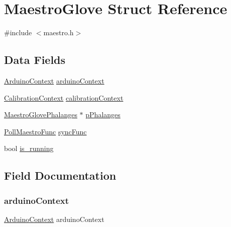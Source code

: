 \hypertarget{struct_maestro_glove}{}\section{Maestro\+Glove Struct Reference}
\label{struct_maestro_glove}


{\ttfamily \#include $<$maestro.\+h$>$}

\subsection*{Data Fields}
\begin{DoxyCompactItemize}
\item 
\hyperlink{struct_arduino_context}{Arduino\+Context} \hyperlink{struct_maestro_glove_a1b23be3f91d761ca3fb50b094c6b7bcb}{arduino\+Context}
\item 
\hyperlink{struct_calibration_context}{Calibration\+Context} \hyperlink{struct_maestro_glove_a58344b4748ecf4e30f6c312652ca7fc5}{calibration\+Context}
\item 
\hyperlink{struct_maestro_glove_phalanges}{Maestro\+Glove\+Phalanges} $\ast$ \hyperlink{struct_maestro_glove_ab47b4ed87837884b7114c36131b3a87b}{p\+Phalanges}
\item 
\hyperlink{maestro_8h_af5aa626ca28c2c60d6df17f73d397915}{Poll\+Maestro\+Func} \hyperlink{struct_maestro_glove_aece1868250475a618a3096b9d6c906d8}{sync\+Func}
\item 
bool \hyperlink{struct_maestro_glove_a95cbd6b99430748422cc048b4f29dc52}{is\+\_\+running}
\end{DoxyCompactItemize}


\subsection{Field Documentation}
\mbox{\label{struct_maestro_glove_a1b23be3f91d761ca3fb50b094c6b7bcb}} 
\subsubsection{\texorpdfstring{arduino\+Context}{arduinoContext}}
{\footnotesize\ttfamily \hyperlink{struct_arduino_context}{Arduino\+Context} arduino\+Context}

\mbox{\label{struct_maestro_glove_a58344b4748ecf4e30f6c312652ca7fc5}} 
